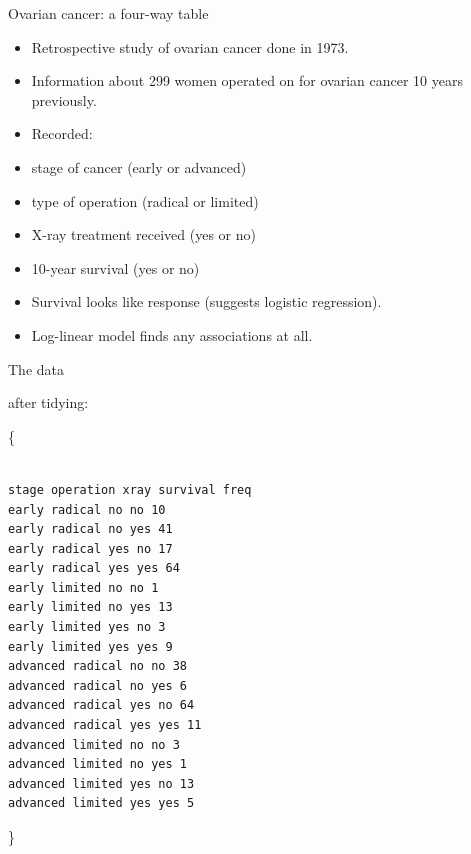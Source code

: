 \documentclass[ignorenonframetext,]{beamer}
\begin{document}
\begin{frame}{Ovarian cancer: a four-way table}
\protect\hypertarget{ovarian-cancer-a-four-way-table}{}

\begin{itemize}
\item
  Retrospective study of ovarian cancer done in 1973.
\item
  Information about 299 women operated on for ovarian cancer 10 years
  previously.
\item
  Recorded:
\item
  stage of cancer (early or advanced)
\item
  type of operation (radical or limited)
\item
  X-ray treatment received (yes or no)
\item
  10-year survival (yes or no)
\item
  Survival looks like response (suggests logistic regression).
\item
  Log-linear model finds any associations at all.
\end{itemize}

\end{frame}

\begin{frame}[fragile]{The data}
\protect\hypertarget{the-data-14}{}

after tidying:

\{\scriptsize

\begin{verbatim}

stage operation xray survival freq
early radical no no 10
early radical no yes 41
early radical yes no 17
early radical yes yes 64
early limited no no 1
early limited no yes 13
early limited yes no 3
early limited yes yes 9
advanced radical no no 38
advanced radical no yes 6
advanced radical yes no 64
advanced radical yes yes 11
advanced limited no no 3
advanced limited no yes 1
advanced limited yes no 13
advanced limited yes yes 5

\end{verbatim}

\}

\end{frame}
\end{document}
